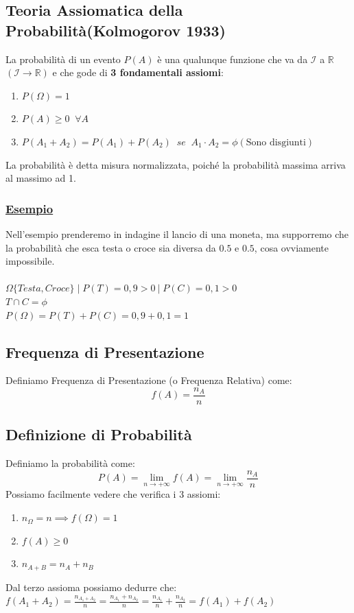 \documentclass{article}
\begin{document}
\subsection{Teoria Assiomatica della Probabilità(Kolmogorov 1933)}
La probabilità di un evento $P(A)$ è una qualunque funzione che va da $\mathcal{I}$ a $\mathbb{R}$ $\left( \mathcal{I} \rightarrow \mathbb{R} \right)$ e che gode di \textbf{3 fondamentali assiomi}:
\begin{enumerate}
    \item $P\left(\Omega\right) = 1$
    \item $P(A) \geq 0 \;\;\forall A$
    \item $P(A_1 +A_2) = P(A_1) + P(A_2) \; \; se \;\; A_1 \cdot A_2 = \phi \left(\text{Sono disgiunti}\right)$
\end{enumerate} 
La probabilità è detta misura normalizzata, poiché la probabilità massima arriva al massimo ad 1.
\subsubsection{\underline{Esempio}}
Nell’esempio prenderemo in indagine il lancio di una moneta, ma supporremo che la probabilità che esca testa o croce sia diversa da $0.5$ e $0.5$, cosa ovviamente impossibile. \\ \\
$\Omega \{Testa,Croce\} \;\big|\; P(T) = 0,9 > 0 \:\big|\; P(C) = 0,1>0$ \\
$T \cap C = \phi $ \\
$P(\Omega) = P(T) + P(C) = 0,9 +0,1 = 1$

\subsection{Frequenza di Presentazione}
Definiamo Frequenza di Presentazione (o Frequenza Relativa) come:
\[f(A) = \frac{n_A}{n}\]

\subsection{Definizione di Probabilità}
Definiamo la probabilità come:
\[P(A) = \lim_{n \to +\infty} f(A) = \lim_{n \to +\infty} \frac{n_A}{n}\]
Possiamo facilmente vedere che verifica i 3 assiomi:
\begin{enumerate}
    \item $n_\Omega = n \implies f(\Omega) = 1$
    \item $f(A) \geq 0$
    \item $n_{A+B} = n_A + n_B$
\end{enumerate}
Dal terzo assioma possiamo dedurre che: \\
$f(A_1 + A_2) = \frac{n_{A_1 + A_2}}{n} = \frac{n_{A_1} +n_{A_2}}{n} = \frac{n_{A_1}}{n} + \frac{n_{A_2}}{n} = f(A_1) + f(A_2)$
\end{document}
